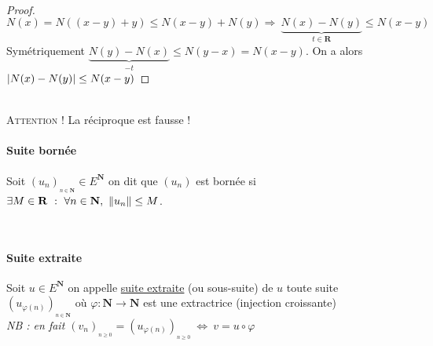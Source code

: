 		 \medskip \\


		\begin{proof}
			$N(x) = N((x-y)+y) \leq N(x-y) + N(y) \Rightarrow ~ \underbrace{N(x) - N(y)}_{t\in \mathbf{R}} \leq N(x-y)$\\
			Symétriquement $\underbrace{N(y)-N(x)}_{-t} \leq N(y-x) = N(x-y)$. On a alors $\left\vert N(x) - N(y) \right\vert \leq N(x-y)$
		\end{proof} \medskip

			
		 \medskip \\ {\small \textsc{Attention !} La réciproque est fausse !}

		\vspace{-15pt}
		\traitd
		\paragraph{Suite bornée}
			Soit $\left(u_n\right)_{_{n\in\mathbf{N}}} \in E^{\mathbf{N}}$ on dit que $\left(u_n\right)$ est bornée si
			$\exists M \in \mathbf{R} ~:~ \forall n\in\mathbf{N} ,~\left\Vert u_n \right\Vert\leq M$. 
		\trait

		 \medskip \\

		
		\traitd
		\paragraph{Suite extraite}
			Soit $u \in E^{\mathbf{N}}$ on appelle \underline{suite extraite} (ou sous-suite) de $u$ toute suite
			$\left(u_{\varphi (n)}\right)_{_{n\in \mathbf{N}}}$ où $\varphi : \mathbf{N} \rightarrow \mathbf{N}$ 
			est une extractrice (injection croissante) \\ \textit{\small NB : en fait $\left(v_n\right)_{_{n\geq0}} = 
			\left(u_{\varphi (n)} \right)_{_{n\geq 0}} ~\Leftrightarrow ~v= u\circ\varphi$} 
		\traitdouble
